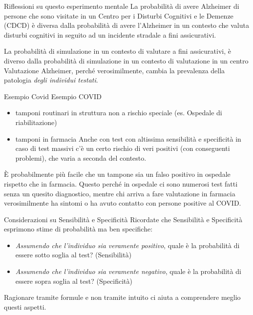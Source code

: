 \documentclass[
  ignorenonframetext,
  aspectratio=169,
]{beamer}
\providecommand{\tightlist}{%
  \setlength{\itemsep}{0pt}\setlength{\parskip}{0pt}}
\begin{document}
\begin{frame}{Riflessioni su questo esperimento mentale}
\label{riflessioni-su-questo-esperimento-mentale-1}
La probabilità di avere Alzheimer di persone che sono visitate in un
Centro per i Disturbi Cognitivi e le Demenze (CDCD) è diversa dalla
probabilità di avere l'Alzheimer in un contesto che valuta disturbi
cognitivi in seguito ad un incidente stradale a fini assicurativi.

La probabilità di simulazione in un contesto di valutare a fini
assicurativi, è diverso dalla probabilità di simulazione in un contesto
di valutazione in un centro Valutazione Alzheimer, perché
verosimilmente, cambia la prevalenza della patologia \emph{degli
individui testati}.
\end{frame}

\begin{frame}{Esempio Covid}
\label{esempio-covid}
Esempio COVID

\begin{itemize}
\tightlist
\item
  tamponi routinari in struttura non a rischio speciale (es. Ospedale di
  riabilitazione)
\item
  tamponi in farmacia \pause Anche con test con altissima sensibilità e
  specificità in caso di test massivi c'è un certo rischio di veri
  positivi (con conseguenti problemi), che varia a seconda del contesto.
\end{itemize}

È probabilmente più facile che un tampone sia un falso positivo in
ospedale rispetto che in farmacia. Questo perché in ospedale ci sono
numerosi test fatti senza un quesito diagnostico, mentre chi arriva a
fare valutazione in farmacia verosimilmente ha sintomi o ha avuto
contatto con persone positive al COVID.
\end{frame}

\begin{frame}{Considerazioni su Sensibilità e Specificità}
\label{considerazioni-su-sensibilituxe0-e-specificituxe0}
Ricordate che Sensibilità e Specificità esprimono stime di probabilità
ma ben specifiche:

\begin{itemize}
\small
\item \emph{Assumendo che l'individuo sia veramente positivo}, quale è la probabilità di essere sotto soglia al test? (Sensibilità)
\item \emph{Assumendo che l'individuo sia veramente negativo}, quale è la probabilità di essere sopra soglia al test? (Specificità) 
\end{itemize}

Ragionare tramite formule e non tramite intuito ci aiuta a comprendere
meglio questi aspetti.
\end{frame}
\end{document}

